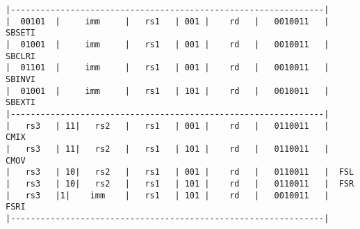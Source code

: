 \begin{minipage}{\linewidth}
\begin{verbatim}
|---------------------------------------------------------------|
|  00101  |     imm     |   rs1   | 001 |    rd   |   0010011   |  SBSETI
|  01001  |     imm     |   rs1   | 001 |    rd   |   0010011   |  SBCLRI
|  01101  |     imm     |   rs1   | 001 |    rd   |   0010011   |  SBINVI
|  01001  |     imm     |   rs1   | 101 |    rd   |   0010011   |  SBEXTI
|---------------------------------------------------------------|
|   rs3   | 11|   rs2   |   rs1   | 001 |    rd   |   0110011   |  CMIX
|   rs3   | 11|   rs2   |   rs1   | 101 |    rd   |   0110011   |  CMOV
|   rs3   | 10|   rs2   |   rs1   | 001 |    rd   |   0110011   |  FSL
|   rs3   | 10|   rs2   |   rs1   | 101 |    rd   |   0110011   |  FSR
|   rs3   |1|    imm    |   rs1   | 101 |    rd   |   0010011   |  FSRI
|---------------------------------------------------------------|
\end{verbatim}
\end{minipage}

